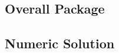 \documentclass{article}
\begin{document}
	\subsection{Overall Package}
	\subsection{Numeric Solution} \label{NumericSoln}
	


\end{document}
